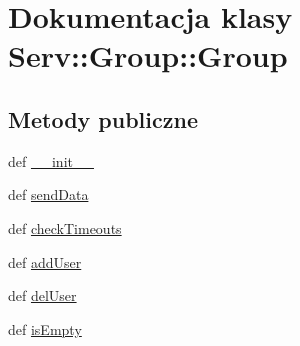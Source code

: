 \hypertarget{class_serv_1_1_group_1_1_group}{
\section{Dokumentacja klasy Serv::Group::Group}
\label{class_serv_1_1_group_1_1_group}
}
\subsection*{Metody publiczne}
\begin{DoxyCompactItemize}
\item 
def \hyperlink{class_serv_1_1_group_1_1_group_aee5bd24c2c39d9c06c11aec410690c3d}{\_\-\_\-init\_\-\_\-}
\item 
def \hyperlink{class_serv_1_1_group_1_1_group_acbb0137781676208d4de16b90d8d9cc0}{sendData}
\item 
def \hyperlink{class_serv_1_1_group_1_1_group_aff52dadf0f67e54340f9602cc3a6fbba}{checkTimeouts}
\item 
def \hyperlink{class_serv_1_1_group_1_1_group_a0a4183d2362794bd55741a35e4b5a91d}{addUser}
\item 
def \hyperlink{class_serv_1_1_group_1_1_group_a48768b6b5440e56d42d632085b2a8aef}{delUser}
\item 
def \hyperlink{class_serv_1_1_group_1_1_group_a51e7ce8393ee398260d4e12e904da5ab}{isEmpty}
\end{DoxyCompactItemize}
